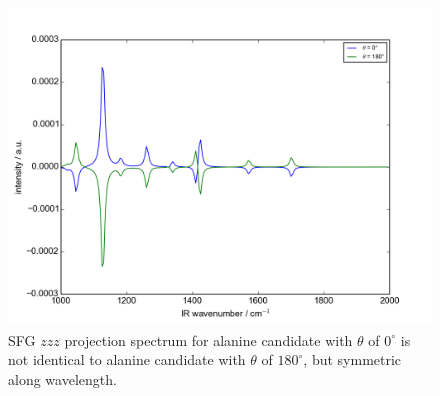 \begin{figure}[!ht] 
\centering
\includegraphics[scale=0.7]{Figures/Ala_candidates_plotting_sfg_zzz_2.png}
\caption{SFG $zzz$ projection spectrum for alanine candidate with $\theta$ of $0^{\circ}$ is not identical to alanine candidate with $\theta$ of $180^{\circ}$, but symmetric along wavelength.} 
\label{fig:A.3}
\end{figure}

